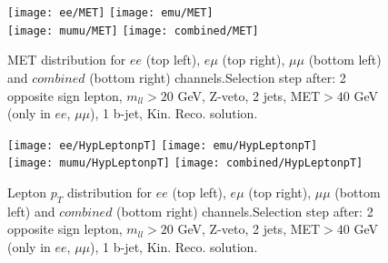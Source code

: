 



\begin{figure}
  \texttt{[image: ee/MET]}
  \texttt{[image: emu/MET]}\\
  \texttt{[image: mumu/MET]}
  \texttt{[image: combined/MET]}
\caption{MET distribution for $ee$ (top left), $e\mu$ (top right), $\mu\mu$ (bottom left) and $combined$ (bottom right) channels.\newline Selection step after: 2 opposite sign lepton, $m_{ll}>20$ GeV, Z-veto, 2 jets, MET$>40$ GeV (only in $ee$, $\mu\mu$), 1 b-jet, Kin. Reco. solution.}
\end{figure}

\clearpage
\newpage



\begin{figure}
  \texttt{[image: ee/HypLeptonpT]}
  \texttt{[image: emu/HypLeptonpT]}\\
  \texttt{[image: mumu/HypLeptonpT]}
  \texttt{[image: combined/HypLeptonpT]}
\caption{Lepton $p_T$ distribution for $ee$ (top left), $e\mu$ (top right), $\mu\mu$ (bottom left) and $combined$ (bottom right) channels.\newline Selection step after: 2 opposite sign lepton, $m_{ll}>20$ GeV, Z-veto, 2 jets, MET$>40$ GeV (only in $ee$, $\mu\mu$), 1 b-jet, Kin. Reco. solution.}
\end{figure}

